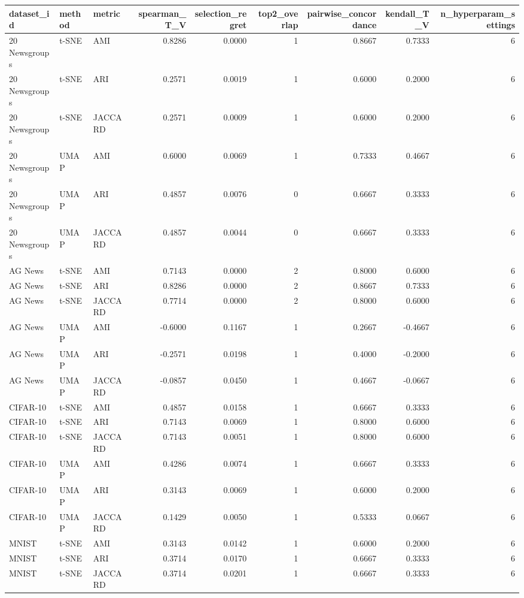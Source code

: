 \begin{tabular}{lllrrrrrr}
\toprule
dataset_id & method & metric & spearman_T_V & selection_regret & top2_overlap & pairwise_concordance & kendall_T_V & n_hyperparam_settings \\
\midrule
20 Newsgroups & t-SNE & AMI & 0.8286 & 0.0000 & 1 & 0.8667 & 0.7333 & 6 \\
20 Newsgroups & t-SNE & ARI & 0.2571 & 0.0019 & 1 & 0.6000 & 0.2000 & 6 \\
20 Newsgroups & t-SNE & JACCARD & 0.2571 & 0.0009 & 1 & 0.6000 & 0.2000 & 6 \\
20 Newsgroups & UMAP & AMI & 0.6000 & 0.0069 & 1 & 0.7333 & 0.4667 & 6 \\
20 Newsgroups & UMAP & ARI & 0.4857 & 0.0076 & 0 & 0.6667 & 0.3333 & 6 \\
20 Newsgroups & UMAP & JACCARD & 0.4857 & 0.0044 & 0 & 0.6667 & 0.3333 & 6 \\
AG News & t-SNE & AMI & 0.7143 & 0.0000 & 2 & 0.8000 & 0.6000 & 6 \\
AG News & t-SNE & ARI & 0.8286 & 0.0000 & 2 & 0.8667 & 0.7333 & 6 \\
AG News & t-SNE & JACCARD & 0.7714 & 0.0000 & 2 & 0.8000 & 0.6000 & 6 \\
AG News & UMAP & AMI & -0.6000 & 0.1167 & 1 & 0.2667 & -0.4667 & 6 \\
AG News & UMAP & ARI & -0.2571 & 0.0198 & 1 & 0.4000 & -0.2000 & 6 \\
AG News & UMAP & JACCARD & -0.0857 & 0.0450 & 1 & 0.4667 & -0.0667 & 6 \\
CIFAR-10 & t-SNE & AMI & 0.4857 & 0.0158 & 1 & 0.6667 & 0.3333 & 6 \\
CIFAR-10 & t-SNE & ARI & 0.7143 & 0.0069 & 1 & 0.8000 & 0.6000 & 6 \\
CIFAR-10 & t-SNE & JACCARD & 0.7143 & 0.0051 & 1 & 0.8000 & 0.6000 & 6 \\
CIFAR-10 & UMAP & AMI & 0.4286 & 0.0074 & 1 & 0.6667 & 0.3333 & 6 \\
CIFAR-10 & UMAP & ARI & 0.3143 & 0.0069 & 1 & 0.6000 & 0.2000 & 6 \\
CIFAR-10 & UMAP & JACCARD & 0.1429 & 0.0050 & 1 & 0.5333 & 0.0667 & 6 \\
MNIST & t-SNE & AMI & 0.3143 & 0.0142 & 1 & 0.6000 & 0.2000 & 6 \\
MNIST & t-SNE & ARI & 0.3714 & 0.0170 & 1 & 0.6667 & 0.3333 & 6 \\
MNIST & t-SNE & JACCARD & 0.3714 & 0.0201 & 1 & 0.6667 & 0.3333 & 6 \\

\end{tabular}
